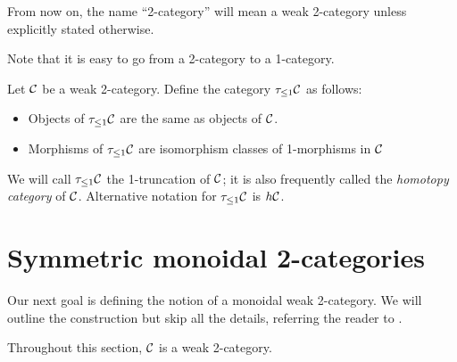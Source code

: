 \begin{convention}
  From now on, the name ``2-category'' will mean a weak 2-category unless
  explicitly stated otherwise.
\end{convention}
Note that it is easy to go from a 2-category to a 1-category.
\begin{definition}\label{d:hC}
  Let $\mathcal{C}$ be a weak 2-category. Define the category $\tau_{\leq 1}\mathcal{C}$
  as follows:
  \begin{itemize}
    \item Objects of $\tau_{\leq 1}\mathcal{C}$ are the same as objects of $\mathcal{C}$.
    \item Morphisms of $\tau_{\leq 1}\mathcal{C}$ are isomorphism classes of 1-morphisms in
    $\mathcal{C}$
  \end{itemize}
  We will call $\tau_{\leq 1}\mathcal{C}$ the 1-truncation of $\mathcal{C}$; it is also frequently
  called the  \emph{homotopy category} of $\mathcal{C}$.
  Alternative notation for $\tau_{\leq 1}\mathcal{C}$ is $h\mathcal{C}$.
\end{definition}

\section{Symmetric monoidal 2-categories}\label{s:sym-mon-2cat}


Our next goal is defining the notion of a monoidal weak 2-category. We will
outline the construction but skip all the details, referring the reader to
\cite[Appendix C]{schommer-pries}.

Throughout this section, $\mathcal{C}$ is a weak 2-category.

